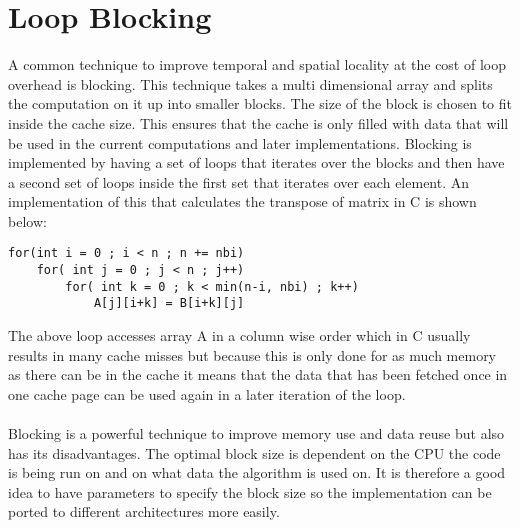 \section{Loop Blocking}
A common technique to improve temporal and spatial locality at the cost of loop overhead is blocking. This technique takes a multi dimensional array and splits the computation on it up into smaller blocks. The size of the block is chosen to fit inside the cache size. This ensures that the cache is only filled with data that will be used in the current computations and later implementations. Blocking is implemented by having a set of loops that iterates over the blocks and then have a second set of loops inside the first set that iterates over each element. An implementation of this that calculates the transpose of matrix in C is shown below: 
\begin{lstlisting}
for(int i = 0 ; i < n ; n += nbi)
	for( int j = 0 ; j < n ; j++)
		for( int k = 0 ; k < min(n-i, nbi) ; k++)
			A[j][i+k] = B[i+k][j]
\end{lstlisting}
The above loop accesses array A in a column wise order which in C usually results in many cache misses but because this is only done for as much memory as there can be in the cache it means that the data that has been fetched once in one cache page can be used again in a later iteration of the loop.
\\\\
Blocking is a powerful technique to improve memory use and data reuse but also has its disadvantages. The optimal block size is dependent on the CPU the code is being run on and on what data the algorithm is used on. It is therefore a good idea to have parameters to specify the block size so the implementation can be ported to different architectures more easily.